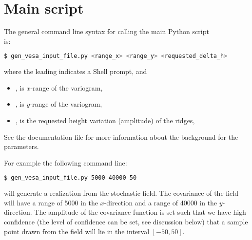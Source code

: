 \documentclass[11pt,a4paper]{amsart}
\begin{document}
\section{Main script}
The general command line syntax for calling the main Python script\\
\mainScriptKJ{} is:
\begin{lstlisting}[language=bash,basicstyle=\scriptsize]
$ gen_vesa_input_file.py <range_x> <range_y> <requested_delta_h>
\end{lstlisting}
where the leading \hltexttt{\$} indicates a Shell prompt, and
\begin{itemize}
\item \rangeX{}, is $x$-range of the variogram,
\item \rangeY{}, is $y$-range of the variogram,
\item \paramAmp{}, is the requested height variation (amplitude) of the ridges,
\end{itemize}
See the documentation file \docSetup{} for more information about the
background for the parameters.

For example the following command line:
\begin{lstlisting}[language=bash]
$ gen_vesa_input_file.py 5000 40000 50
\end{lstlisting}
will generate a realization from the stochastic field. The covariance of
the field will have a range of 5000 in the $x$-direction and a range of 40000 in
the $y$-direction. The amplitude of the covariance function is set such that
we have high confidence (the level of confidence can be set, see discussion
below) that a sample point drawn from the field will lie in the interval $[-50, 50]$.
\end{document}
